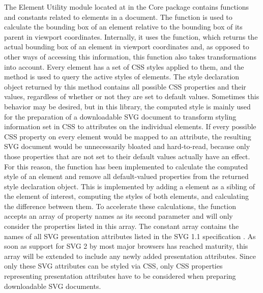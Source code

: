 The Element Utility module located at  in
the Core package contains functions and constants related to elements
in a document. The  function is used to
calculate the bounding box of an element relative to the bounding box
of its parent in viewport coordinates. Internally, it uses the
 function, which returns the actual
bounding box of an element in viewport coordinates and, as opposed to
other ways of accessing this information, this function also takes
transformations into account. Every element has a set of CSS styles
applied to them, and the  method is used
to query the active styles of elements. The style declaration object
returned by this method contains all possible CSS properties and their
values, regardless of whether or not they are set to default values.
Sometimes this behavior may be desired, but in this library, the
computed style is mainly used for the preparation of a downloadable
SVG document to transform styling information set in CSS to attributes
on the individual elements. If every possible CSS property on every
element would be mapped to an attribute, the resulting SVG document
would be unnecessarily bloated and hard-to-read, because only those
properties that are not set to their default values actually have an
effect. For this reason, the
 function has been
implemented to calculate the computed style of an element and remove
all default-valued properties from the returned style declaration
object. This is implemented by adding a  element
as a sibling of the element of interest, computing the styles of both
elements, and calculating the difference between them. To accelerate
these calculations, the 
function accepts an array of property names as its second parameter
and will only consider the properties listed in this array. The
constant  array contains the names
of all SVG presentation attributes listed in the SVG 1.1 specification
\parencite{SVG11}. As soon as support for SVG 2 \parencite{SVG2} by
most major browsers has reached maturity, this array will be extended
to include any newly added presentation attributes. Since only these
SVG attributes can be styled via CSS, only CSS properties representing
presentation attributes have to be considered when preparing
downloadable SVG documents.

